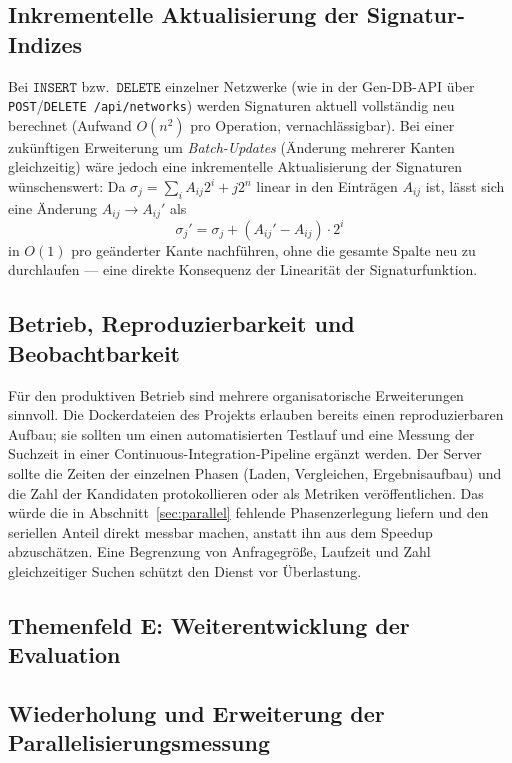 \documentclass[a4paper,12pt, twoside]{report}
\theoremstyle{definition}
\begin{document}
\subsection{Inkrementelle Aktualisierung der Signatur-Indizes}

Bei $\texttt{INSERT}$ bzw.\ $\texttt{DELETE}$ einzelner Netzwerke (wie in der Gen-DB-API über \texttt{POST}/\texttt{DELETE /api/networks}) werden Signaturen aktuell vollständig neu berechnet (Aufwand $O(n^2)$ pro Operation, vernachlässigbar). Bei einer zukünftigen Erweiterung um \emph{Batch-Updates} (Änderung mehrerer Kanten gleichzeitig) wäre jedoch eine inkrementelle Aktualisierung der Signaturen wünschenswert: Da $\sigma_j=\sum_iA_{ij}2^i+j2^n$ linear in den Einträgen $A_{ij}$ ist, lässt sich eine Änderung $A_{ij}\to A_{ij}'$ als
\[
\sigma_j' = \sigma_j + (A_{ij}'-A_{ij})\cdot 2^i
\]
in $O(1)$ pro geänderter Kante nachführen, ohne die gesamte Spalte neu zu durchlaufen — eine direkte Konsequenz der Linearität der Signaturfunktion.


\subsection{Betrieb, Reproduzierbarkeit und Beobachtbarkeit}

Für den produktiven Betrieb sind mehrere organisatorische Erweiterungen sinnvoll. Die Dockerdateien des Projekts erlauben bereits einen reproduzierbaren Aufbau; sie sollten um einen automatisierten Testlauf und eine Messung der Suchzeit in einer Continuous-Integration-Pipeline ergänzt werden. Der Server sollte die Zeiten der einzelnen Phasen (Laden, Vergleichen, Ergebnisaufbau) und die Zahl der Kandidaten protokollieren oder als Metriken veröffentlichen. Das würde die in Abschnitt~\ref{sec:parallel} fehlende Phasenzerlegung liefern und den seriellen Anteil direkt messbar machen, anstatt ihn aus dem Speedup abzuschätzen. Eine Begrenzung von Anfragegröße, Laufzeit und Zahl gleichzeitiger Suchen schützt den Dienst vor Überlastung.

\subsection*{Themenfeld E: Weiterentwicklung der Evaluation}

\subsection{Wiederholung und Erweiterung der Parallelisierungsmessung}
\label{sec:par_erweiterung}
\end{document}
